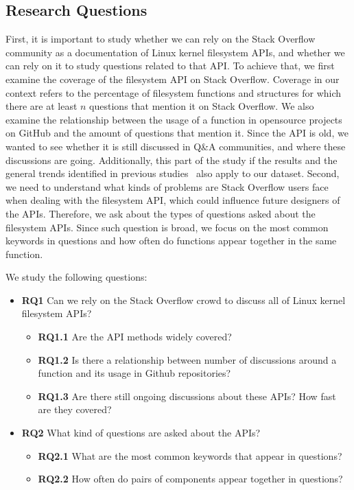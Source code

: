 \subsection{Research Questions}\label{subsec:rq}
First, it is important to study whether we can rely on the Stack Overflow community as a documentation of Linux kernel filesystem APIs, and whether we can rely on it to study questions related to that API. To achieve that, we first examine the coverage of the filesystem API on Stack Overflow. Coverage in our context refers to the percentage of filesystem functions and structures for which there are at least $n$ questions that mention it on Stack Overflow. We also examine the relationship between the usage of a function in opensource projects on GitHub and the amount of questions that mention it. Since the API is old, we wanted to see whether it is still discussed in Q\&A communities, and where these discussions are going. Additionally, this part of the study if the results and the general trends identified in previous studies~\cite{Parnin2012CrowdDE} also apply to our dataset.
Second, we need to understand what kinds of problems are Stack Overflow users face when dealing with the filesystem API, which could influence future designers of the APIs. Therefore, we ask about the types of questions asked about the filesystem APIs. Since such question is broad, we focus on the most common keywords in questions and how often do functions appear together in the same function.

We study the following questions:
\begin{itemize}
  \item
  \textbf{RQ1} Can we rely on the Stack Overflow crowd to discuss all of Linux kernel filesystem APIs?
  \begin{itemize}
    \item
    \textbf{RQ1.1} Are the API methods widely covered?
    \item
    \textbf{RQ1.2} Is there a relationship between number of discussions around a function and its usage in Github repositories?
    \item
    \textbf{RQ1.3} Are there still ongoing discussions about these APIs? How fast are they covered?
  \end{itemize}
  \item
  \textbf{RQ2} What kind of questions are asked about the APIs?
  \begin{itemize}
    \item
    \textbf{RQ2.1} What are the most common keywords that appear in questions?
    \item
    \textbf{RQ2.2} How often do pairs of components appear together in questions?
  \end{itemize}
\end{itemize}

